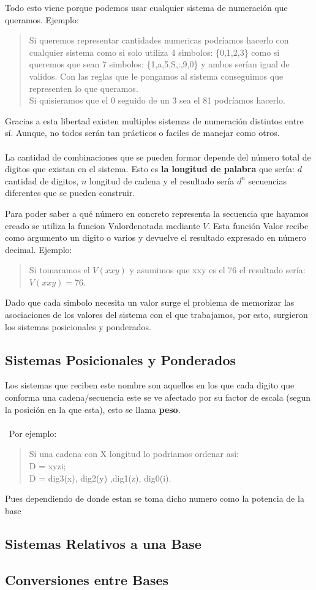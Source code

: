 \documentclass{article}
\begin{document}
Todo esto viene porque podemos usar cualquier sistema de numeración que queramos.
Ejemplo:
\begin{quote}
    Si queremos representar cantidades numericas podríamos hacerlo con cualquier
    sistema como si solo utiliza 4 simbolos: \{0,1,2,3\} como si queremos que sean
    7 simbolos: \{1,a,5,S,:,9,0\} y ambos serían igual de validos. Con las reglas
    que le pongamos al sistema conseguimos que representen lo que queramos.\\
    Si quisieramos que el 0 seguido de un 3 sea el 81 podríamos hacerlo.
\end{quote}

Gracias a esta libertad existen multiples sistemas de numeración distintos entre
sí. Aunque, no todos serán tan prácticos o faciles de manejar como otros.\\\\

La cantidad de  combinaciones que se pueden formar depende del número total
de digitos que existan en el sistema. Esto es \textbf{la longitud de palabra}
que sería: 
$d$ cantidad de digitos, $n$ longitud de cadena y el resultado sería $d^n$ 
secuencias diferentes que se pueden construir.

Para poder saber a qué número en concreto representa la secuencia que hayamos
creado se utiliza la funcion \"Valor\" denotada mediante $V$. Esta función Valor
recibe como argumento un digito o varios y devuelve el resultado expresado en
número decimal.
Ejemplo:
\begin{quote}
    Si tomaramos el $V(xxy)$ y asumimos que xxy es el 76 el resultado sería:
    $V(xxy)=76$.
\end{quote}

Dado que cada simbolo necesita un valor surge el problema de memorizar
las asociaciones de los valores del sistema con el que trabajamos, por esto,
surgieron los sistemas posicionales y ponderados.

\subsection{Sistemas Posicionales y Ponderados}

Los sistemas que reciben este nombre son aquellos en los que cada digito
que conforma una cadena/secuencia este se ve afectado por su factor de escala
(segun la posición en la que esta), esto se llama \textbf{peso}.\\\\\
Por ejemplo:
\begin{quote}
    Si una cadena con X longitud lo podriamos ordenar asi:\\
    D = xyzi;\\
    D = dig3(x), dig2(y) ,dig1(z), dig0(i).
\end{quote}

Pues dependiendo de donde estan se toma dicho numero como la potencia de la base

\subsection{Sistemas Relativos a una Base}
\subsection{Conversiones entre Bases}
\end{document}
